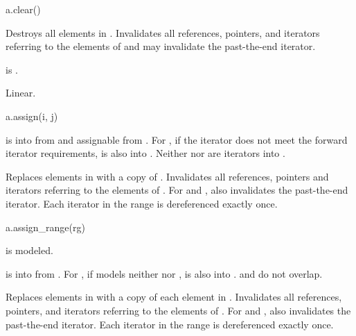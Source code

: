 %
\begin{itemdecl}
a.clear()
\end{itemdecl}

\begin{itemdescr}
\pnum
\result
{}

\pnum
\effects
Destroys all elements in .
Invalidates all references, pointers, and iterators
referring to the elements of  and
may invalidate the past-the-end iterator.

\pnum
\ensures
{} is .

\pnum
\complexity
Linear.
\end{itemdescr}

%
\begin{itemdecl}
a.assign(i, j)
\end{itemdecl}

\begin{itemdescr}
\pnum
\result
{}

\pnum
\expects
{} is  into  from 
and assignable from .
For ,
if the iterator does not meet
the forward iterator requirements,
 is also  into .
Neither  nor  are iterators into .

\pnum
\effects
Replaces elements in  with a copy of \tcode{[i, j)}.
Invalidates all references, pointers and iterators
referring to the elements of .
For  and ,
also invalidates the past-the-end iterator.
Each iterator in the range  is dereferenced exactly once.
\end{itemdescr}

%
\begin{itemdecl}
a.assign_range(rg)
\end{itemdecl}

\begin{itemdescr}
\pnum
\result
{}

\pnum
\mandates
{}
is modeled.

\pnum
\expects
{} is  into 
from .
For ,
if  models
neither  nor ,
 is also  into .
 and  do not overlap.

\pnum
\effects
Replaces elements in  with a copy of each element in .
Invalidates all references, pointers, and iterators
referring to the elements of .
For  and ,
also invalidates the past-the-end iterator.
Each iterator in the range  is dereferenced exactly once.
\end{itemdescr}

